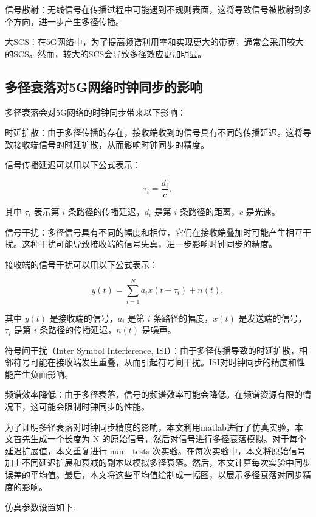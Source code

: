 \documentclass[UTF8,a4paper,12pt]{ctexart}
\numberwithin{equation}{section}
\begin{document}
信号散射：无线信号在传播过程中可能遇到不规则表面，这将导致信号被散射到多个方向，进一步产生多径传播。

大SCS：在5G网络中，为了提高频谱利用率和实现更大的带宽，通常会采用较大的SCS。然而，较大的SCS会导致多径效应更加明显。

\subsection{多径衰落对5G网络时钟同步的影响}

多径衰落会对5G网络的时钟同步带来以下影响：

时延扩散：由于多径传播的存在，接收端收到的信号具有不同的传播延迟。这将导致接收端信号的时延扩散，从而影响时钟同步的精度。

信号传播延迟可以用以下公式表示：

\begin{equation}
	\tau_i = \frac{d_i}{c},
\end{equation}

其中 $\tau_i$ 表示第 $i$ 条路径的传播延迟，$d_i$ 是第 $i$ 条路径的距离，$c$ 是光速。

信号干扰：多径信号具有不同的幅度和相位，它们在接收端叠加时可能产生相互干扰。这种干扰可能导致接收端的信号失真，进一步影响时钟同步的精度。

接收端的信号干扰可以用以下公式表示：

\begin{equation}
	y(t) = \sum_{i=1}^{N} a_i x(t - \tau_i) + n(t),
\end{equation}

其中 $y(t)$ 是接收端的信号，$a_i$ 是第 $i$ 条路径的幅度，$x(t)$ 是发送端的信号，$\tau_i$ 是第 $i$ 条路径的传播延迟，$n(t)$ 是噪声。

符号间干扰（Inter Symbol Interference, ISI）：由于多径传播导致的时延扩散，相邻符号可能在接收端发生重叠，从而引起符号间干扰。ISI对时钟同步的精度和性能产生负面影响。

频谱效率降低：由于多径衰落，信号的频谱效率可能会降低。在频谱资源有限的情况下，这可能会限制时钟同步的性能。

为了证明多径衰落对时钟同步精度的影响，本文利用matlab进行了仿真实验，本文首先生成一个长度为 N 的原始信号，然后对信号进行多径衰落模拟。对于每个延迟扩展值，本文重复进行 num\_tests 次实验。在每次实验中，本文将原始信号加上不同延迟扩展和衰减的副本以模拟多径衰落。然后，本文计算每次实验中同步误差的平均值。最后，本文将这些平均值绘制成一幅图，以展示多径衰落对同步精度的影响。

仿真参数设置如下:
\end{document}
